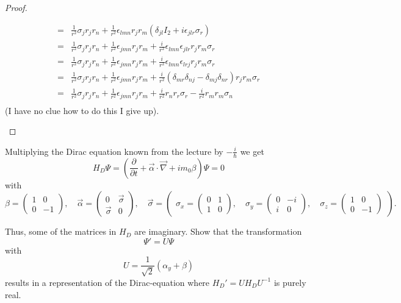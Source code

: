 \begin{proof}
\begin{enumerate}[label=(\alph*)]
\begin{align*}
	=&\frac{1}{r^2}\sigma_j r_j r_n + \frac{1}{r^2}\epsilon_{lmn}r_jr_m(\delta_{jl}I_2+i\epsilon_{jlr}\sigma_r)\\
	=&\frac{1}{r^2}\sigma_j r_j r_n + \frac{1}{r^2}\epsilon_{jmn} r_j r_m + \frac{i}{r^2}\epsilon_{lmn}\epsilon_{jlr}r_j r_m \sigma_r\\
	=&\frac{1}{r^2}\sigma_j r_j r_n + \frac{1}{r^2}\epsilon_{jmn} r_j r_m + \frac{i}{r^2}\epsilon_{lmn}\epsilon_{lrj}r_j r_m \sigma_r \\
	=&\frac{1}{r^2}\sigma_j r_j r_n + \frac{1}{r^2}\epsilon_{jmn} r_j r_m + \frac{i}{r^2}\left( \delta_{mr}\delta_{nj}-\delta_{mj}\delta_{nr} \right) r_j r_m \sigma_r \\
	=&\frac{1}{r^2}\sigma_j r_j r_n + \frac{1}{r^2}\epsilon_{jmn} r_j r_m + \frac{i}{r^2}r_n r_r \sigma_r - \frac{i}{r^2} r_m r_m \sigma_n \\
\end{align*}
		(I have no clue how to do this I give up).\qedhere
\end{enumerate}
\end{proof}
\begin{Problem}

Multiplying the Dirac equation known from the lecture by \( -\frac{i}{\hbar} \) we get 
\[ H_D \Psi = \left(\frac{\partial}{\partial t} + \vec{\alpha} \cdot \vec{\nabla} + im_0 \beta\right) \Psi = 0\]
with 
\[ \beta = \begin{pmatrix} 1 & 0 \\ 0 & -1 \end{pmatrix}, \quad \vec{\alpha} = \begin{pmatrix} 0 & \vec{\sigma} \\ \vec{\sigma} & 0 \end{pmatrix}, \quad \vec{\sigma} = \begin{pmatrix} \sigma_x = \begin{pmatrix} 0 & 1 \\ 1 & 0 \end{pmatrix}, \quad \sigma_y = \begin{pmatrix} 0 & -i \\ i & 0 \end{pmatrix}, \quad \sigma_z = \begin{pmatrix} 1 & 0 \\ 0 & -1 \end{pmatrix} \end{pmatrix}. \]

Thus, some of the matrices in \( H_D \) are imaginary. Show that the transformation 
\[ \Psi' = U \Psi \tag{4} \]
with 
\[ U = \frac{1}{\sqrt{2}}(\alpha_y + \beta) \]
results in a representation of the Dirac-equation where \( H_D' = UH_DU^{-1} \) is purely real.
\end{Problem}
